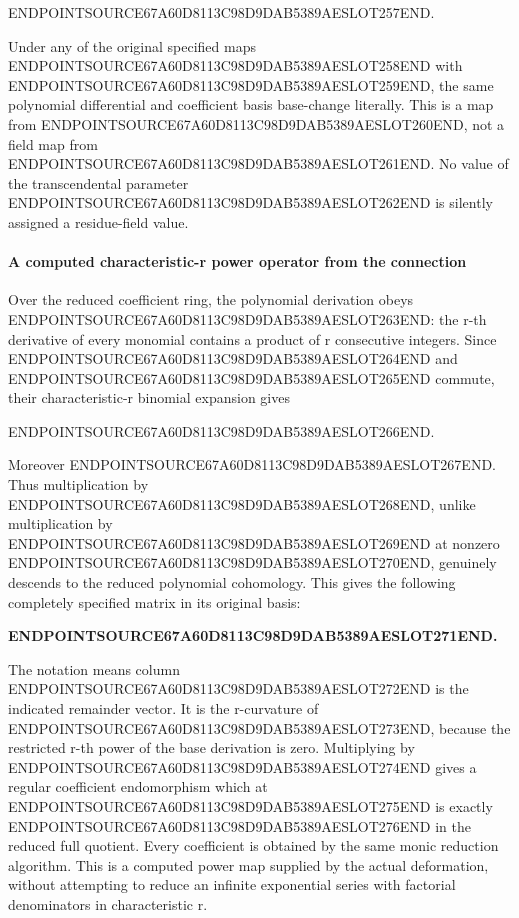 ENDPOINTSOURCE67A60D8113C98D9DAB5389AESLOT257END.

Under any of the original specified maps ENDPOINTSOURCE67A60D8113C98D9DAB5389AESLOT258END with ENDPOINTSOURCE67A60D8113C98D9DAB5389AESLOT259END, the same polynomial differential and coefficient basis base-change literally. This is a map from ENDPOINTSOURCE67A60D8113C98D9DAB5389AESLOT260END, not a field map from ENDPOINTSOURCE67A60D8113C98D9DAB5389AESLOT261END. No value of the transcendental parameter ENDPOINTSOURCE67A60D8113C98D9DAB5389AESLOT262END is silently assigned a residue-field value.

\paragraph{A computed characteristic-r power operator from the connection}\label{endpoint-f1_scaling--a-computed-characteristic-r-power-operator-from-the-connection}

Over the reduced coefficient ring, the polynomial derivation obeys ENDPOINTSOURCE67A60D8113C98D9DAB5389AESLOT263END: the r-th derivative of every monomial contains a product of r consecutive integers. Since ENDPOINTSOURCE67A60D8113C98D9DAB5389AESLOT264END and ENDPOINTSOURCE67A60D8113C98D9DAB5389AESLOT265END commute, their characteristic-r binomial expansion gives

ENDPOINTSOURCE67A60D8113C98D9DAB5389AESLOT266END.

Moreover ENDPOINTSOURCE67A60D8113C98D9DAB5389AESLOT267END. Thus multiplication by ENDPOINTSOURCE67A60D8113C98D9DAB5389AESLOT268END, unlike multiplication by ENDPOINTSOURCE67A60D8113C98D9DAB5389AESLOT269END at nonzero ENDPOINTSOURCE67A60D8113C98D9DAB5389AESLOT270END, genuinely descends to the reduced polynomial cohomology. This gives the following completely specified matrix in its original basis:

\textbf{ENDPOINTSOURCE67A60D8113C98D9DAB5389AESLOT271END.}

The notation means column ENDPOINTSOURCE67A60D8113C98D9DAB5389AESLOT272END is the indicated remainder vector. It is the r-curvature of ENDPOINTSOURCE67A60D8113C98D9DAB5389AESLOT273END, because the restricted r-th power of the base derivation is zero. Multiplying by ENDPOINTSOURCE67A60D8113C98D9DAB5389AESLOT274END gives a regular coefficient endomorphism which at ENDPOINTSOURCE67A60D8113C98D9DAB5389AESLOT275END is exactly ENDPOINTSOURCE67A60D8113C98D9DAB5389AESLOT276END in the reduced full quotient. Every coefficient is obtained by the same monic reduction algorithm. This is a computed power map supplied by the actual deformation, without attempting to reduce an infinite exponential series with factorial denominators in characteristic r.

